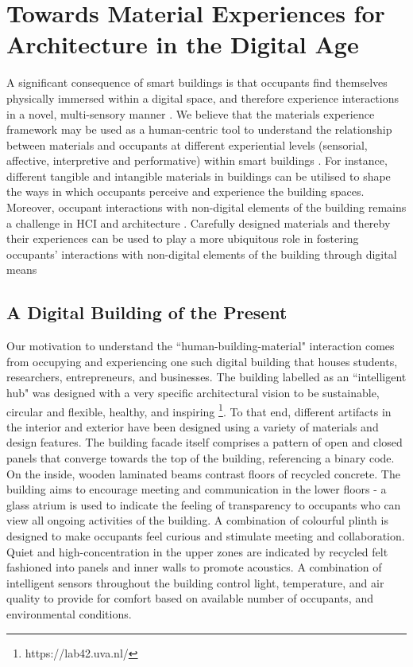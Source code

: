 \documentclass[manuscript, anonymous, review]{acmart}
\begin{document}
\section{Towards Material Experiences for Architecture in the Digital Age}

A significant consequence of smart buildings is that occupants find themselves physically immersed within a digital space, and therefore experience interactions in a novel, multi-sensory manner \cite{nembrini2017human}. We believe that the materials experience framework may be used as a human-centric tool to understand the relationship between materials and occupants at different experiential levels (sensorial, affective, interpretive and performative) within smart buildings \cite{giaccardi2015foundations}. For instance, different tangible and intangible materials in buildings can be utilised to shape the ways in which occupants perceive and experience the building spaces. Moreover, occupant interactions with non-digital elements of the building remains a challenge in HCI and architecture \cite{nembrini2017human}. Carefully designed materials and thereby their experiences can be used to play a more ubiquitous role in fostering occupants' interactions with non-digital elements of the building through digital means
 

\subsection{A Digital Building of the Present}
Our motivation to understand the ``human-building-material" interaction comes from occupying and experiencing one such digital building that houses students, researchers, entrepreneurs, and businesses. The building labelled as an ``intelligent hub" was designed with a very specific architectural vision to be sustainable, circular and flexible, healthy, and inspiring \footnote{https://lab42.uva.nl/}. To that end, different artifacts in the interior and exterior have been designed using a variety of materials and design features. The building facade itself comprises a pattern of open and closed panels that converge towards the top of the building, referencing a binary code. On the inside, wooden laminated beams contrast floors of recycled concrete. The building aims to encourage meeting and communication in the lower floors - a glass atrium is used to indicate the feeling of transparency to occupants who can view all ongoing activities of the building. A combination of colourful plinth is designed to make occupants feel curious and stimulate meeting and collaboration. Quiet and high-concentration in the upper zones are indicated by recycled felt fashioned into panels and inner walls to promote acoustics. A combination of intelligent sensors throughout the building control light, temperature, and air quality to provide for comfort based on available number of occupants, and environmental conditions. 
\end{document}
